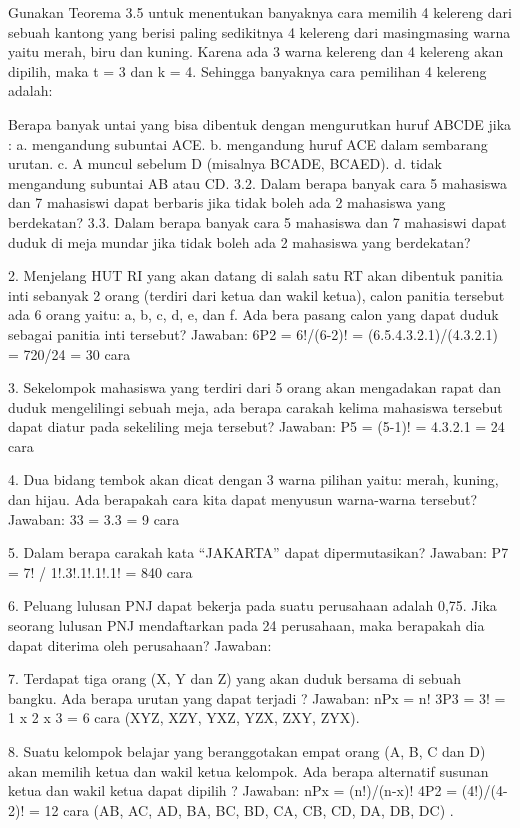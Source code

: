 \documentclass[11pt,fleqn]{book} %
\begin{document}
{Gunakan Teorema 3.5 untuk menentukan banyaknya cara memilih 4 kelereng
dari sebuah kantong yang berisi paling sedikitnya 4 kelereng dari masingmasing
warna yaitu merah, biru dan kuning.
Karena ada 3 warna kelereng dan 4 kelereng akan dipilih, maka t = 3 dan
k = 4. Sehingga banyaknya cara pemilihan 4 kelereng adalah:

Berapa banyak untai yang bisa dibentuk dengan mengurutkan huruf
ABCDE jika :
a. mengandung subuntai ACE.
b. mengandung huruf ACE dalam sembarang urutan.
c. A muncul sebelum D (misalnya BCADE, BCAED).
d. tidak mengandung subuntai AB atau CD.
3.2. Dalam berapa banyak cara 5 mahasiswa dan 7 mahasiswi dapat berbaris
jika tidak boleh ada 2 mahasiswa yang berdekatan?
3.3. Dalam berapa banyak cara 5 mahasiswa dan 7 mahasiswi dapat duduk
di meja mundar jika tidak boleh ada 2 mahasiswa yang berdekatan?

 2.  Menjelang HUT RI yang akan datang di salah satu RT akan dibentuk panitia inti sebanyak 2 orang (terdiri dari ketua dan wakil ketua), calon panitia tersebut ada 6 orang yaitu: a, b, c, d, e, dan f. Ada bera pasang calon yang dapat duduk sebagai panitia inti tersebut?
Jawaban:
6P2 = 6!/(6-2)!
       = (6.5.4.3.2.1)/(4.3.2.1)
       = 720/24
       = 30 cara

3. Sekelompok mahasiswa yang terdiri dari 5 orang akan mengadakan rapat dan duduk mengelilingi sebuah meja, ada berapa carakah kelima mahasiswa tersebut dapat diatur pada sekeliling meja tersebut?
Jawaban:
P5 = (5-1)!
    = 4.3.2.1
    = 24 cara

4. Dua bidang tembok akan dicat dengan 3 warna pilihan yaitu: merah, kuning, dan hijau. Ada berapakah cara kita dapat menyusun warna-warna tersebut?
Jawaban:
33 = 3.3 = 9 cara

 5. Dalam berapa carakah kata “JAKARTA” dapat dipermutasikan?
Jawaban:
P7 = 7! / 1!.3!.1!.1!.1!
      = 840 cara

6.  Peluang lulusan PNJ dapat bekerja pada suatu perusahaan adalah 0,75. Jika seorang lulusan PNJ mendaftarkan pada 24 perusahaan, maka berapakah dia dapat diterima oleh perusahaan?
Jawaban:

7.  Terdapat tiga orang (X, Y dan Z) yang akan duduk bersama di sebuah bangku. Ada berapa urutan yang dapat terjadi ?
Jawaban:
nPx = n!
3P3 = 3!
       = 1 x 2 x 3
       = 6 cara (XYZ, XZY, YXZ, YZX, ZXY, ZYX).

8.  Suatu kelompok belajar yang beranggotakan empat orang (A, B, C dan D) akan memilih ketua dan wakil ketua kelompok. Ada berapa alternatif susunan ketua dan wakil ketua dapat dipilih ?
Jawaban:
nPx = (n!)/(n-x)!
4P2 = (4!)/(4-2)!
        = 12 cara (AB, AC, AD, BA, BC, BD, CA, CB, CD, DA, DB, DC) .

}
\end{document}
